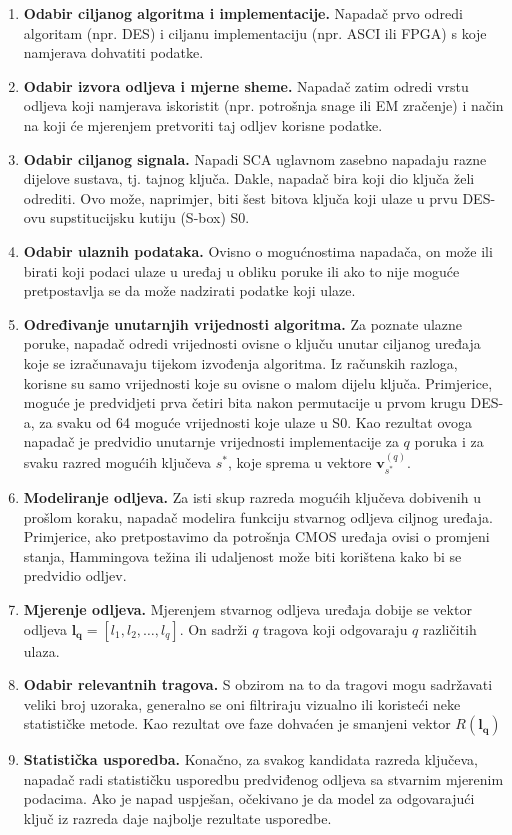 \documentclass[times, utf8, diplomski]{fer}
\begin{document}
\begin{enumerate}
    \item{\textbf{Odabir ciljanog algoritma i implementacije.}} Napadač prvo odredi algoritam (npr. DES) i ciljanu implementaciju (npr. ASCI ili FPGA) s koje namjerava dohvatiti podatke.
    \item{\textbf{Odabir izvora odljeva i mjerne sheme.}} Napadač zatim odredi vrstu odljeva koji namjerava iskoristit (npr. potrošnja snage ili EM zračenje) i način na koji će mjerenjem pretvoriti taj odljev korisne podatke.
    \item{\textbf{Odabir ciljanog signala.}} Napadi SCA uglavnom zasebno napadaju razne dijelove sustava, tj. tajnog ključa. Dakle, napadač bira koji dio ključa želi odrediti. Ovo može, naprimjer, biti šest bitova ključa koji ulaze u prvu DES-ovu supstitucijsku kutiju (S-box) S0.
    \item{\textbf{Odabir ulaznih podataka.}} Ovisno o mogućnostima napadača, on može ili birati koji podaci ulaze u uređaj u obliku poruke ili ako to nije moguće pretpostavlja se da može nadzirati podatke koji ulaze.
    \item{\textbf{Određivanje unutarnjih vrijednosti algoritma.}} Za poznate ulazne poruke, napadač odredi vrijednosti ovisne o ključu unutar ciljanog uređaja koje se izračunavaju tijekom izvođenja algoritma. Iz računskih razloga, korisne su samo vrijednosti koje su ovisne o malom dijelu ključa. Primjerice, moguće je predvidjeti prva četiri bita nakon permutacije u prvom krugu DES-a, za svaku od 64 moguće vrijednosti koje ulaze u S0. Kao rezultat ovoga napadač je predvidio unutarnje vrijednosti implementacije za $q$ poruka i za svaku razred mogućih ključeva $s^*$, koje sprema u vektore $\bm{v}_{s^*}^{(q)}$.
    \item{\textbf{Modeliranje odljeva.}} Za isti skup razreda mogućih ključeva dobivenih u prošlom koraku, napadač modelira funkciju stvarnog odljeva ciljnog uređaja. Primjerice, ako pretpostavimo da potrošnja CMOS uređaja ovisi o promjeni stanja, Hammingova težina ili udaljenost može biti korištena kako bi se predvidio odljev.
    \item{\textbf{Mjerenje odljeva.}} Mjerenjem stvarnog odljeva uređaja dobije se vektor odljeva $\bm{l_q} = \left[ l_1, l_2, \dots, l_q \right]$. On sadrži $q$ tragova koji odgovaraju $q$ različitih ulaza.
    \item{\textbf{Odabir relevantnih tragova.}} S obzirom na to da tragovi mogu sadržavati veliki broj uzoraka, generalno se oni filtriraju vizualno ili koristeći neke statističke metode. Kao rezultat ove faze dohvaćen je smanjeni vektor $R(\bm{l_q})$
    \item{\textbf{Statistička usporedba.}} Konačno, za svakog kandidata razreda ključeva, napadač radi statističku usporedbu predviđenog odljeva sa stvarnim mjerenim podacima. Ako je napad uspješan, očekivano je da model za odgovarajući ključ iz razreda daje najbolje rezultate usporedbe.
\end{enumerate}
\end{document}
